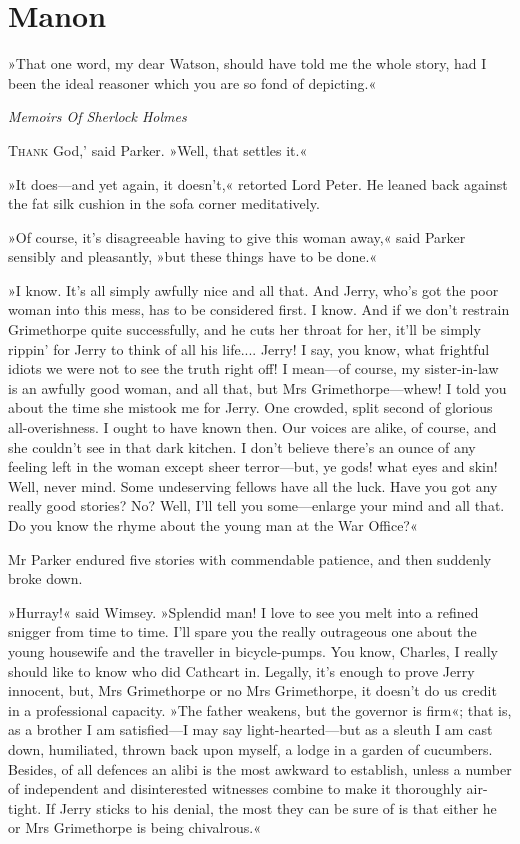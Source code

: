 
\chapter{Manon}
\epigraph{»That one word, my dear Watson, should have told me the whole story, had I been the ideal reasoner which you are so fond of depicting.«}{\textit{Memoirs Of Sherlock Holmes}}

\lettrine[lines=4,ante=`]{T}{hank} God,' said Parker. »Well, that settles it.«

\zz
»It does\allowbreak---\allowbreak and yet again, it doesn't,« retorted Lord Peter. He leaned back against the fat silk cushion in the sofa corner meditatively.

»Of course, it's disagreeable having to give this woman away,« said Parker sensibly and pleasantly, »but these things have to be done.«

»I know. It's all simply awfully nice and all that. And Jerry, who's got the poor woman into this mess, has to be considered first. I know. And if we don't restrain Grimethorpe quite successfully, and he cuts her throat for her, it'll be simply rippin' for Jerry to think of all his life.... Jerry! I say, you know, what frightful idiots we were not to see the truth right off! I mean\allowbreak---\allowbreak of course, my sister-in-law is an awfully good woman, and all that, but Mrs Grimethorpe\allowbreak---\allowbreak whew! I told you about the time she mistook me for Jerry. One crowded, split second of glorious all-overishness. I ought to have known then. Our voices are alike, of course, and she couldn't see in that dark kitchen. I don't believe there's an ounce of any feeling left in the woman except sheer terror\allowbreak---\allowbreak but, ye gods! what eyes and skin! Well, never mind. Some undeserving fellows have all the luck. Have you got any really good stories? No? Well, I'll tell you some\allowbreak---\allowbreak enlarge your mind and all that. Do you know the rhyme about the young man at the War Office?«

Mr Parker endured five stories with commendable patience, and then suddenly broke down.

»Hurray!« said Wimsey. »Splendid man! I love to see you melt into a refined snigger from time to time. I'll spare you the really outrageous one about the young housewife and the traveller in bicycle-pumps. You know, Charles, I really should like to know who did Cathcart in. Legally, it's enough to prove Jerry innocent, but, Mrs Grimethorpe or no Mrs Grimethorpe, it doesn't do us credit in a professional capacity. »The father weakens, but the governor is firm«; that is, as a brother I am satisfied\allowbreak---\allowbreak I may say light-hearted\allowbreak---\allowbreak but as a sleuth I am cast down, humiliated, thrown back upon myself, a lodge in a garden of cucumbers. Besides, of all defences an alibi is the most awkward to establish, unless a number of independent and disinterested witnesses combine to make it thoroughly air-tight. If Jerry sticks to his denial, the most they can be sure of is that either he or Mrs Grimethorpe is being chivalrous.«


